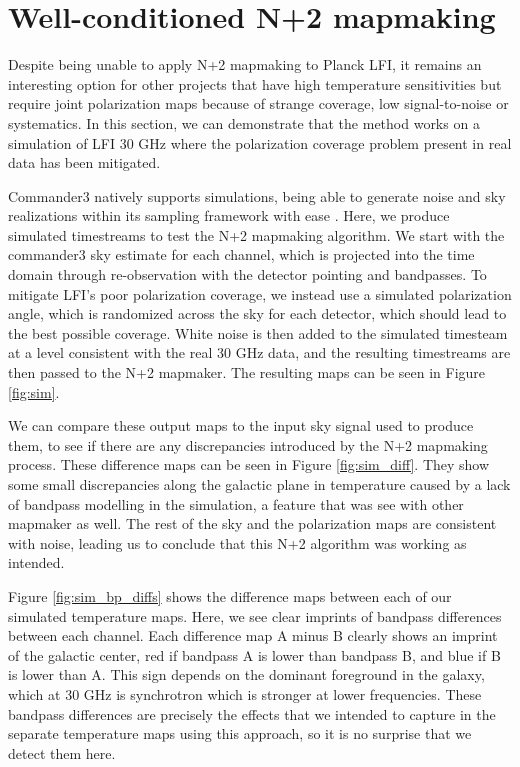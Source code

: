 \documentclass{aa}
\begin{document}
\section{Well-conditioned N+2 mapmaking}
\label{sec:sim}


Despite being unable to apply N+2 mapmaking to Planck LFI, it remains an interesting option for other projects that have high temperature sensitivities but require joint polarization maps because of strange coverage, low signal-to-noise or systematics. In this section, we can demonstrate that the method works on a simulation of LFI 30 GHz where the polarization coverage problem present in real data has been mitigated.

Commander3 natively supports simulations, being able to generate noise and sky realizations within its sampling framework with ease \citep{BP04}. Here, we produce simulated timestreams to test the N+2 mapmaking algorithm. We start with the commander3 sky estimate for each channel, which is projected into the time domain through re-observation with the detector pointing and bandpasses. To mitigate LFI's poor polarization coverage, we instead use a simulated polarization angle, which is randomized across the sky for each detector, which should lead to the best possible coverage. White noise is then added to the simulated timesteam at a level consistent with the real 30 GHz data, and the resulting timestreams are then passed to the N+2 mapmaker. The resulting maps can be seen in Figure \ref{fig:sim}.

We can compare these output maps to the input sky signal used to produce them, to see if there are any discrepancies introduced by the N+2 mapmaking process. These difference maps can be seen in Figure \ref{fig:sim_diff}. They show some small discrepancies along the galactic plane in temperature caused by a lack of bandpass modelling in the simulation, a feature that was see with other mapmaker as well. The rest of the sky and the polarization maps are consistent with noise, leading us to conclude that this N+2 algorithm was working as intended.

Figure \ref{fig:sim_bp_diffs} shows the difference maps between each of our simulated temperature maps. Here, we see clear imprints of bandpass differences between each channel. Each difference map A minus B clearly shows an imprint of the galactic center, red if bandpass A is lower than bandpass B, and blue if B is lower than A. This sign depends on the dominant foreground in the galaxy, which at 30 GHz is synchrotron which is stronger at lower frequencies. These bandpass differences are precisely the effects that we intended to capture in the separate temperature maps using this approach, so it is no surprise that we detect them here.
\end{document}
